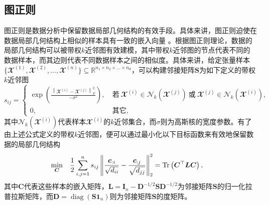 \subsection{图正则}\label{sec:graphreg}
图正则是数据分析中保留数据局部几何结构的有效手段。具体来讲，图正则迫使在数据局部几何结构上相似的样本具有一致的嵌入向量
。根据图正则理论，数据的局部几何结构可以被带权$k$近邻图有效建模，其中带权$k$近邻图的节点代表不同的数据样本，而其边则代表不同数据样本之间的相似度。具体来讲，给定张量样本$\{\mathbfcal{X}^{(1)},\mathbfcal{X}^{(2)},\ldots,\mathbfcal{X}^{(n)}\}\subseteq\mathbb{R}^{n_{1}\times n_{2}\times \ldots \times n_{d}}$，可以构建邻接矩阵$\boldsymbol{S}$为如下定义的带权$k$近邻图
\begin{equation*}
s_{i j}=\begin{cases}
	\exp\left(\frac{\left\|\mathbfcal{X}^{(i)}-\mathbfcal{X}^{(j)}\right\|_{F}^{2}}{- \sigma^{2}}\right), & ~\text{若}~ \mathbfcal{X}^{(i)} \in \mathcal{N}_{k}\left(\mathbfcal{X}^{(j)}\right)~\text{或}~\mathbfcal{X}^{(j)} \in \mathcal{N}_{k}\left(\mathbfcal{X}^{(i)}\right), \\
	0, & ~\text{其它},
  \end{cases}
\end{equation*}
其中$\mathcal{N}_{k}\left(\mathbfcal{X}^{(i)}\right)$代表样本$\mathbfcal{X}^{(i)}$的$k$近邻集合，而$\sigma$则为高斯核的宽度参数。有了由上述公式定义的带权$k$近邻图，便可以通过最小化以下目标函数来有效地保留数据的局部几何结构
\begin{equation*}
\begin{aligned}
    &\underset{\mathclap{\boldsymbol{C}}}{\min} && \frac{1}{2} \sum_{i, j=1}^{n} s_{i j}\left\|\frac{\boldsymbol{c}_{:i}}{\sqrt{d_{i i}}}-\frac{\boldsymbol{c}_{:j}}{\sqrt{d_{j j}}}\right\|_{2}^{2}=\operatorname{Tr}\left(\boldsymbol{C}^{\top} \boldsymbol{L C}\right),
\end{aligned}
\end{equation*}
其中$\boldsymbol{C}$代表这些样本的嵌入矩阵，$\boldsymbol{L}=\boldsymbol{I}_{n}-\boldsymbol{D}^{-1/2}\boldsymbol{S}\boldsymbol{D}^{-1/2}$为邻接矩阵$\boldsymbol{S}$的归一化拉普拉斯矩阵，而$\boldsymbol{D}=\operatorname{diag}(\boldsymbol{S}\boldsymbol{1}_{n})$则为邻接矩阵$\boldsymbol{S}$的度矩阵。


